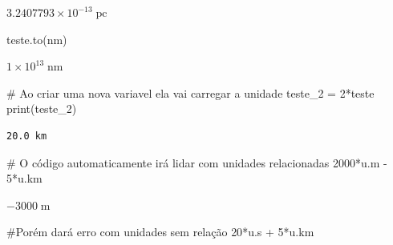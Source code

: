 \documentclass[
  letterpaper,
  DIV=11,
  numbers=noendperiod]{scrreprt}
\newenvironment{Shaded}{\begin{snugshade}}{\end{snugshade}}
\newcommand{\BuiltInTok}[1]{\textcolor[rgb]{0.00,0.23,0.31}{#1}}
\newcommand{\CommentTok}[1]{\textcolor[rgb]{0.37,0.37,0.37}{#1}}
\newcommand{\DecValTok}[1]{\textcolor[rgb]{0.68,0.00,0.00}{#1}}
\newcommand{\NormalTok}[1]{\textcolor[rgb]{0.00,0.23,0.31}{#1}}
\newcommand{\OperatorTok}[1]{\textcolor[rgb]{0.37,0.37,0.37}{#1}}
\newcommand{\StringTok}[1]{\textcolor[rgb]{0.13,0.47,0.30}{#1}}
\begin{document}
$3.2407793 \times 10^{-13} \; \mathrm{pc}$

\begin{Shaded}
\begin{Highlighting}[]
\NormalTok{teste.to(}\StringTok{\textquotesingle{}nm\textquotesingle{}}\NormalTok{)}
\end{Highlighting}
\end{Shaded}

$1 \times 10^{13} \; \mathrm{nm}$

\begin{Shaded}
\begin{Highlighting}[]
\CommentTok{\# Ao criar uma nova variavel ela vai carregar a unidade}
\NormalTok{teste\_2 }\OperatorTok{=} \DecValTok{2}\OperatorTok{*}\NormalTok{teste}
\BuiltInTok{print}\NormalTok{(teste\_2)}
\end{Highlighting}
\end{Shaded}

\begin{verbatim}
20.0 km
\end{verbatim}

\begin{Shaded}
\begin{Highlighting}[]
\CommentTok{\# O código automaticamente irá lidar com unidades relacionadas}
\DecValTok{2000}\OperatorTok{*}\NormalTok{u.m }\OperatorTok{{-}} \DecValTok{5}\OperatorTok{*}\NormalTok{u.km}
\end{Highlighting}
\end{Shaded}

$-3000 \; \mathrm{m}$

\begin{Shaded}
\begin{Highlighting}[]
\CommentTok{\#Porém dará erro com unidades sem relação}
\DecValTok{20}\OperatorTok{*}\NormalTok{u.s }\OperatorTok{+} \DecValTok{5}\OperatorTok{*}\NormalTok{u.km}
\end{Highlighting}
\end{Shaded}
\end{document}
